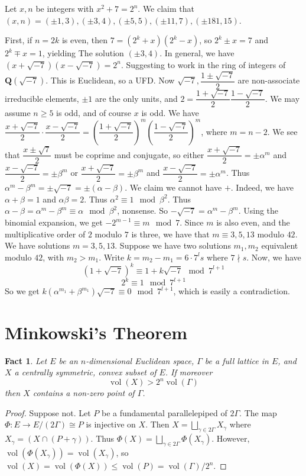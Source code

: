 \documentclass[12pt]{article}
\newtheorem*{fact*}{Fact}
\newcommand{\too}{\longrightarrow}
\DeclareMathOperator{\vol}{vol}
\newcommand{\Q}{\mathbf{Q}}
\begin{document}
Let $x,n$ be integers with $x^2+7=2^n$. We claim that $(x,n) = (\pm1,3),(\pm3,4),(\pm5,5),(\pm11,7),(\pm181,15)$.


First, if $n=2k$ is even, then $7=(2^k+x)(2^k-x)$, so $2^k\pm x=7$ and $2^k\mp x=1$, yielding The solution $(\pm3,4)$. In general, we have $(x+\sqrt{-7})(x-\sqrt{-7})=2^n$. Suggesting to work in the ring of integers of $\Q(\sqrt{-7})$. This is Euclidean, so a UFD. Now $\sqrt{-7}, \dfrac{1\pm\sqrt{-7}}{2}$ are non-associate irreducible elements, $\pm1$ are the only units, and $2=\dfrac{1+\sqrt{-7}}{2}\dfrac{1-\sqrt{-7}}{2}$. We may assume $n\ge 5$ is odd, and of course $x$ is odd. 
We have $\dfrac{x + \sqrt{-7}}{2} \cdot \dfrac{x - \sqrt{-7}}{2} = \left(\dfrac{1+\sqrt{-7}}{2} \right)^m \left(\dfrac{1-\sqrt{-7}}{2} \right)^m$, where $m=n-2$. We see that $\dfrac{x\pm\sqrt{7}}{2}$ must be coprime and conjugate, so either
$\dfrac{x + \sqrt{-7}}{2} = \pm\alpha^m$ and $\dfrac{x - \sqrt{-7}}{2} = \pm\beta^m$
or 
$\dfrac{x + \sqrt{-7}}{2} = \pm\beta^m$ and $\dfrac{x - \sqrt{-7}}{2} = \pm\alpha^m$.  Thus $\alpha^m - \beta^m = \pm\sqrt{-7}=\pm(\alpha-\beta)$.
We claim we cannot have $+$. Indeed, we have $\alpha+\beta=1$ and $\alpha\beta=2$. Thus $\alpha^2\equiv 1\mod \beta^2$. Thus $\alpha-\beta=\alpha^m-\beta^m \equiv \alpha \mod \beta^2$, nonsense. So $-\sqrt{-7} = \alpha^m-\beta^m$. Using the binomial expansion, we get $-2^{m-1}\equiv m\mod 7$. Since $m$ is also even, and the multiplicative order of $2$ modulo $7$ is three, we have that $m\equiv 3,5,13$ modulo $42$. We have solutions $m=3,5,13$. Suppose we have two solutions $m_1,m_2$ equivalent modulo $42$, with $m_2>m_1$. Write $k=m_2-m_1=6\cdot 7^l s$ where $7\nmid s$.
Now, we have 
\[(1+\sqrt{-7})^k \equiv 1+k\sqrt{-7} \mod 7^{l+1}\]
\[2^k\equiv 1\mod 7^{l+1}\]
So we get $k (\alpha^{m_1}+\beta^{m_1})\sqrt{-7} \equiv 0\mod 7^{l+1}$, which is easily a contradiction.




\newpage
\section{Minkowski's Theorem}


\begin{fact*}
Let $E$ be an $n$-dimensional Euclidean space, $\Gamma$ be a full lattice in $E$, and $X$ a centrally symmetric, convex subset of $E$. If moreover 
\[\vol(X) > 2^n \vol(\Gamma)\]
then $X$ contains a non-zero point of $\Gamma$.
\end{fact*}


\begin{proof}
Suppose not. Let $P$ be a fundamental parallelepiped of $2\Gamma$. The map $\Phi : E\too E/(2\Gamma) \cong P$ is injective on $X$.
Then $X = \bigsqcup_{\gamma\in 2\Gamma} X_\gamma$ where $X_\gamma = (X \cap (P+\gamma))$. Thus $\Phi(X) = \bigsqcup_{\gamma\in 2\Gamma} \Phi(X_\gamma)$. However, $\vol(\Phi(X_\gamma)) = \vol(X_\gamma)$, so $\vol(X) = \vol(\Phi(X))\le \vol(P) = \vol(\Gamma)/2^n$.
\end{proof}
\end{document}
